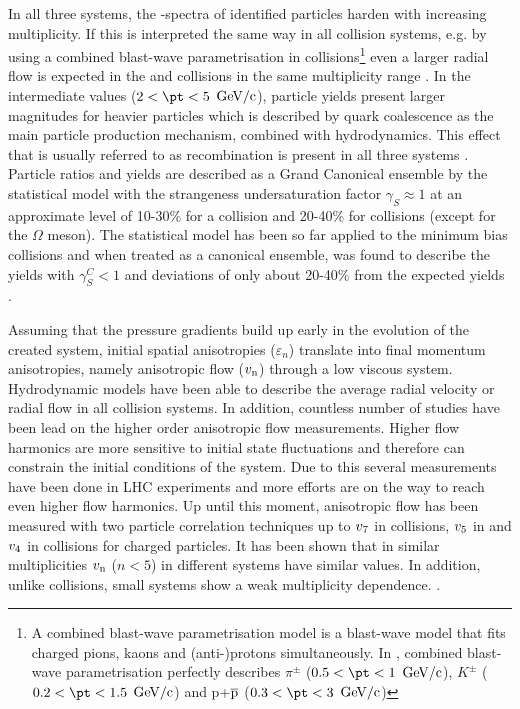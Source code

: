 \documentclass[../report.tex]{subfiles}
\begin{document}
In all three systems, the \pt-spectra of identified particles harden with increasing multiplicity. If this is interpreted the same way in all collision systems, e.g. by using a combined blast-wave parametrisation in \PbPb{} collisions\footnote{A combined blast-wave parametrisation model is a blast-wave model that fits charged pions, kaons and (anti-)protons simultaneously. In \cite{Abelev:2012wca}, combined blast-wave parametrisation perfectly describes $\pi^{\pm}$ ($ 0.5 < \pt < 1$ $\rm{GeV}/c$), $K^{\pm}$ ($ 0.2 < \pt < 1.5$ $\rm{GeV}/c$) and p+$\overline{\rm{p}}$ ($ 0.3 < \pt < 3$ $\rm{GeV}/c$)} even a larger radial flow is expected in the \pp{} and \pPb{} collisions in the same multiplicity range \cite{Shuryak:2013ke}. In the intermediate \pt{} values ($2 < \pt < 5 $ $\rm{GeV}/c$), particle yields present larger magnitudes for heavier particles which is described by quark coalescence as the main particle production mechanism, combined with hydrodynamics. This effect that is usually referred to as recombination is present in all three systems \cite{Andrei:2014vaa,Abelev:2013xaa,Abelev:2013haa,Abelev:2014uua,Khachatryan:2016yru,Adam:2015jca,Adam:2016dau,Adam:2017zbf}. Particle ratios and yields are described as a Grand Canonical ensemble by the statistical model with the strangeness undersaturation factor $\gamma_{S}\approx 1$ at an approximate level of 10-30\% for a \PbPb{} collision and 20-40\% for \pPb{} collisions (except for the $\Omega$ meson). The statistical model has been so far applied to the minimum bias \pp{} collisions and when treated as a canonical ensemble, was found to describe the yields with $\gamma^{C}_{S} < 1$ and deviations of only about 20-40\% from the expected yields \cite{Adam:2016emw,Adam:2016bpr,Adam:2015vsf,ABELEV:2013zaa}. 

Assuming that the pressure gradients build up early in the evolution of the created system, initial spatial anisotropies ($\varepsilon_n$) translate into final momentum anisotropies, namely anisotropic flow ($v_{\rm{n}}$) through a low viscous system. Hydrodynamic models have been able to describe the average radial velocity or radial flow in all collision systems. In addition, countless number of studies have been lead on the higher order anisotropic flow measurements. Higher flow harmonics are more sensitive to initial state fluctuations and therefore can constrain the initial conditions of the system. Due to this several measurements have been done in LHC experiments and more efforts are on the way to reach even higher flow harmonics. Up until this moment, anisotropic flow has been measured with two particle correlation techniques up to $v_{\rm{7}}$ in \PbPb{} collisions, $v_{\rm{5}}$ in \pPb{} and $v_{\rm{4}}$ in \pp{} collisions for charged particles. It has been shown that in similar multiplicities $v_{\rm{n}}$ ($n<5$) in different systems have similar values. In addition, unlike \PbPb{} collisions, small systems show a weak multiplicity dependence. \cite{CMS:2012qk,Abelev:2012ola,Aad:2012gla,Aamodt:2011by,Chatrchyan:2011eka,Chatrchyan:2012wg,ATLAS:2012at,Aad:2014lta,Aad:2015gqa,CMS:2015zpa,Khachatryan:2016txc,Acharya:2017ino,Adam:2016ows,Adam:2016nfo,Acharya:2018zuq,Sirunyan:2017uyl,Aaboud:2017acw}.
\end{document}
